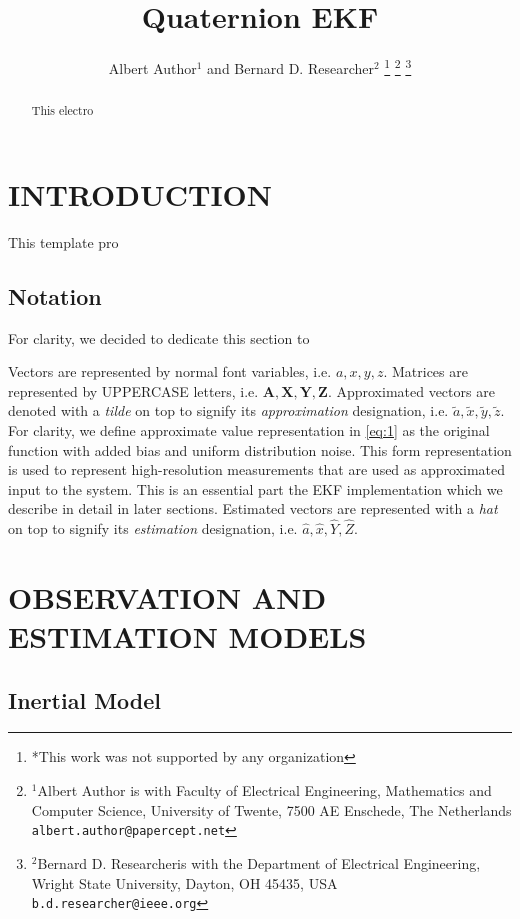 \documentclass[letterpaper, 10 pt, conference]{ieeeconf}  %
\title{\LARGE \bf
Quaternion EKF
}
\author{Albert Author$^{1}$ and Bernard D. Researcher$^{2}$%
\thanks{*This work was not supported by any organization}%
\thanks{$^{1}$Albert Author is with Faculty of Electrical Engineering, Mathematics and Computer Science,
        University of Twente, 7500 AE Enschede, The Netherlands
        {\tt\small albert.author@papercept.net}}%
\thanks{$^{2}$Bernard D. Researcheris with the Department of Electrical Engineering, Wright State University,
        Dayton, OH 45435, USA
        {\tt\small b.d.researcher@ieee.org}}%
}
\begin{document}
\maketitle
\thispagestyle{empty}
\pagestyle{empty}


\begin{abstract}

This electro

\end{abstract}


\section{INTRODUCTION}

This template pro

\subsection{Notation}

For clarity, we decided to dedicate this section to


Vectors are represented by normal font variables, i.e. $a,x,y,z$.
Matrices are represented by UPPERCASE letters, i.e. $\mathbf{A,X,Y,Z}$.
Approximated vectors are denoted with a \textit{tilde} on top
to signify its \textit{approximation} designation, i.e.  $\widetilde{a},\widetilde{x},\widetilde{y},\widetilde{z}$. For clarity, we define approximate value representation
in \ref{eq:1} as the original function with added bias and uniform distribution noise.
This form representation is used to represent high-resolution measurements that
are used as approximated input to the system. This is an essential part the EKF
implementation which we describe in detail in later sections.
Estimated vectors are represented with a \textit{hat} on top
to signify its \textit{estimation} designation, i.e.  $\widehat{a},\widehat{x},\widehat{Y},\widehat{Z}$.




\section{OBSERVATION AND ESTIMATION MODELS}

\subsection{Inertial Model}
\end{document}
